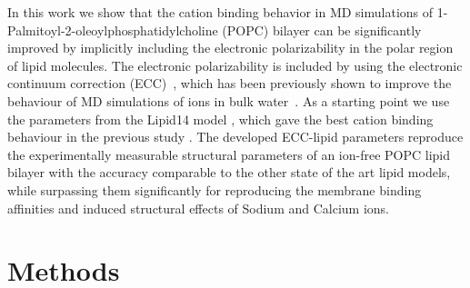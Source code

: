 \documentclass[aip,jcp,twocolumn]{revtex4}
\begin{document}


In this work we show that the cation binding behavior
in MD simulations of 1-Palmitoyl-2-oleoylphosphatidylcholine (POPC) bilayer can be significantly 
improved by implicitly including the electronic polarizability
in the polar region of lipid molecules. The electronic
polarizability is included by using the electronic
continuum correction (ECC)~\cite{leontyev11}, which
has been previously shown to improve the behaviour of
MD simulations of ions in bulk water~\cite{jungwirth17-new-paper-to-be-published,Pluharova2014,kohagen14,kohagen16}. 
As a starting point we use the parameters from the Lipid14 model \cite{dickson14},
which gave the best cation binding behaviour in the previous study \cite{catte16}.
The developed ECC-lipid parameters reproduce the experimentally
measurable structural parameters of an ion-free POPC lipid bilayer with the 
accuracy comparable to the other state of the art lipid models, while surpassing
them significantly for reproducing the membrane binding affinities and induced
structural effects of Sodium and Calcium ions.




\section{Methods}
\end{document}
